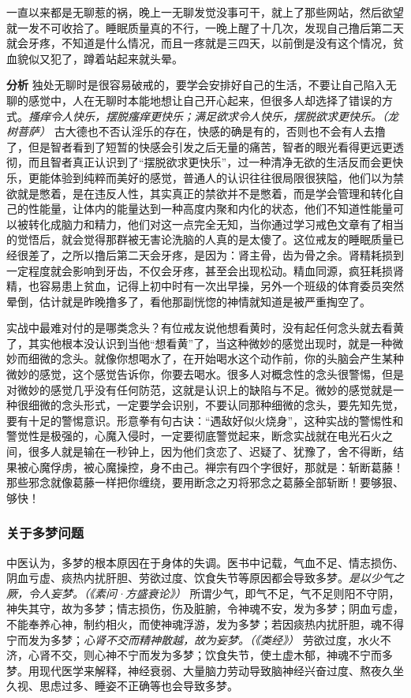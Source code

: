 \begin{case}
    一直以来都是无聊惹的祸，晚上一无聊发觉没事可干，就上了那些网站，然后欲望就一发不可收拾了。睡眠质量真的不行，一晚上醒了十几次，发现自己撸后第二天就会牙疼，不知道是什么情况，而且一疼就是三四天，以前倒是没有这个情况，贫血貌似又犯了，蹲着站起来就头晕。

    \textbf{分析} 独处无聊时是很容易破戒的，要学会安排好自己的生活，不要让自己陷入无聊的感觉中，人在无聊时本能地想让自己开心起来，但很多人却选择了错误的方式。\textit{搔痒令人快乐，摆脱瘙痒更快乐；满足欲求令人快乐，摆脱欲求更快乐。（龙树菩萨）} 古大德也不否认淫乐的存在，快感的确是有的，否则也不会有人去撸了，但是智者看到了短暂的快感会引发之后无量的痛苦，智者的眼光看得更远更透彻，而且智者真正认识到了“摆脱欲求更快乐”，过一种清净无欲的生活反而会更快乐，更能体验到纯粹而美好的感觉，普通人的认识往往很局限很狭隘，他们以为禁欲就是憋着，是在违反人性，其实真正的禁欲并不是憋着，而是学会管理和转化自己的性能量，让体内的能量达到一种高度内聚和内化的状态，他们不知道性能量可以被转化成脑力和精力，他们对这一点完全无知，当你通过学习戒色文章有了相当的觉悟后，就会觉得那群被无害论洗脑的人真的是太傻了。这位戒友的睡眠质量已经很差了，之所以撸后第二天会牙疼，是因为：肾主骨，齿为骨之余。肾精耗损到一定程度就会影响到牙齿，不仅会牙疼，甚至会出现松动。精血同源，疯狂耗损肾精，也容易患上贫血，记得上初中时有一次出早操，另外一个班级的体育委员突然晕倒，估计就是昨晚撸多了，看他那副恍惚的神情就知道是被严重掏空了。
\end{case}

实战中最难对付的是哪类念头？有位戒友说他想看黄时，没有起任何念头就去看黄了，其实他根本没认识到当他“想看黄”了，当这种微妙的感觉出现时，就是一种微妙而细微的念头。就像你想喝水了，在开始喝水这个动作前，你的头脑会产生某种微妙的感觉，这个感觉告诉你，你要去喝水。很多人对概念性的念头很警惕，但是对微妙的感觉几乎没有任何防范，这就是认识上的缺陷与不足。微妙的感觉就是一种很细微的念头形式，一定要学会识别，不要认同那种细微的念头，要先知先觉，要有十足的警惕意识。形意拳有句古诀：“遇敌好似火烧身”，这种实战的警惕性和警觉性是极强的，心魔入侵时，一定要彻底警觉起来，断念实战就在电光石火之间，很多人就是输在一秒钟上，因为他们贪恋了、迟疑了、犹豫了，舍不得断，结果被心魔俘虏，被心魔操控，身不由己。禅宗有四个字很好，那就是：斩断葛藤！那些邪念就像葛藤一样把你缠绕，要用断念之刃将邪念之葛藤全部斩断！要够狠、够快！

\subsubsection{关于多梦问题}

中医认为，多梦的根本原因在于身体的失调。医书中记载，气血不足、情志损伤、阴血亏虚、痰热内扰肝胆、劳欲过度、饮食失节等原因都会导致多梦。\textit{是以少气之厥，令人妄梦。（《素问·方盛衰论》）} 所谓少气，即气不足，气不足则阳不守阴，神失其守，故为多梦；情志损伤，伤及脏腑，令神魂不安，发为多梦；阴血亏虚，不能奉养心神，制约相火，而使神魂浮游，发为多梦；若因痰热内扰肝胆，魂不得宁而发为多梦；\textit{心肾不交而精神散越，故为妄梦。（《类经》）} 劳欲过度，水火不济，心肾不交，则心神不宁而发为多梦；饮食失节，使土虚木郁，神魂不宁而多梦。用现代医学来解释，神经衰弱、大量脑力劳动导致脑神经兴奋过度、熬夜久坐久视、思虑过多、睡姿不正确等也会导致多梦。

